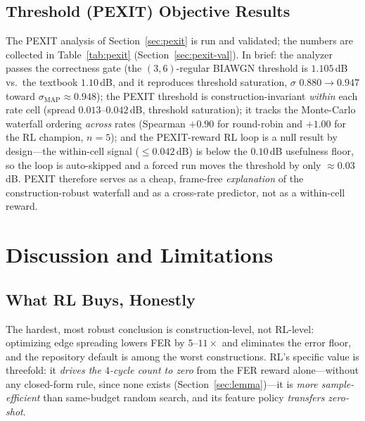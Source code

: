 \documentclass[journal]{IEEEtran}
\begin{document}
\subsection{Threshold (PEXIT) Objective Results}\label{sec:results-pexit}
The PEXIT analysis of Section~\ref{sec:pexit} is run and validated; the numbers
are collected in Table~\ref{tab:pexit} (Section~\ref{sec:pexit-val}). In brief:
the analyzer passes the correctness gate (the $(3,6)$-regular BIAWGN threshold is
$1.105$\,dB vs.\ the textbook $1.10$\,dB, and it reproduces threshold saturation,
$\sigma$ $0.880\!\to\!0.947$ toward $\sigma_{\mathrm{MAP}}\approx0.948$); the
PEXIT threshold is construction-invariant \emph{within} each rate cell
(spread $0.013$--$0.042$\,dB, threshold saturation); it tracks the Monte-Carlo
waterfall ordering \emph{across} rates (Spearman $+0.90$ for round-robin and
$+1.00$ for the RL champion, $n{=}5$); and the PEXIT-reward RL loop is a null
result by design---the within-cell signal ($\le0.042$\,dB) is below the
$0.10$\,dB usefulness floor, so the loop is auto-skipped and a forced run moves
the threshold by only $\approx\!0.03$\,dB. PEXIT therefore serves as a cheap,
frame-free \emph{explanation} of the construction-robust waterfall and as a
cross-rate predictor, not as a within-cell reward.

\section{Discussion and Limitations}\label{sec:discussion}
\subsection{What RL Buys, Honestly}
The hardest, most robust conclusion is construction-level, not RL-level:
optimizing edge spreading lowers FER by $5$--$11\times$ and eliminates the error
floor, and the repository default is among the worst constructions. RL's specific
value is threefold: it \emph{drives the $4$-cycle count to zero} from the FER
reward alone---without any closed-form rule, since none exists
(Section~\ref{sec:lemma})---it is \emph{more sample-efficient} than same-budget
random search, and its feature policy \emph{transfers zero-shot}.
\end{document}
